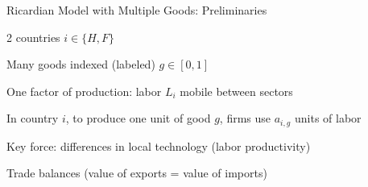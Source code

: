 \documentclass[notes,11pt, aspectratio=169, xcolor=table]{beamer}
\newenvironment{wideitemize}{\itemize\addtolength{\itemsep}{10pt}}{\enditemize}
\begin{document}
\begin{frame}{Ricardian Model with Multiple Goods: Preliminaries}
\begin{wideitemize}
        \item 2 countries $i \in \{ H, F\}$
        \item Many goods indexed (labeled) $g \in [0,1]$
        \item One factor of production: labor $L_i$ mobile between sectors
        \item In country $i$, to produce one unit of good $g$, firms use $a_{i,g}$ units of labor
        \item Key force: differences in local technology (labor productivity)
        \item Trade balances (value of exports = value of imports)
        \end{wideitemize}
\end{frame}
\end{document}
